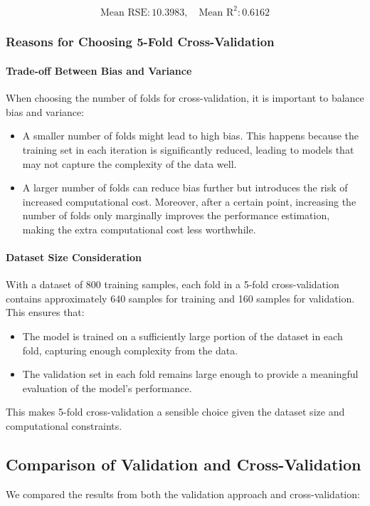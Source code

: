 \documentclass[a4paper,12pt]{article}
\begin{document}
\[
\text{Mean RSE}: 10.3983, \quad \text{Mean R}^2: 0.6162
\]

\subsubsection*{Reasons for Choosing 5-Fold Cross-Validation}

\paragraph{Trade-off Between Bias and Variance}
When choosing the number of folds for cross-validation, it is important to balance bias and variance:

\begin{itemize}
    \item A smaller number of folds  might lead to high bias. This happens because the training set in each iteration is significantly reduced, leading to models that may not capture the complexity of the data well.
    \item A larger number of folds  can reduce bias further but introduces the risk of increased computational cost. Moreover, after a certain point, increasing the number of folds only marginally improves the performance estimation, making the extra computational cost less worthwhile.
\end{itemize}

\paragraph{Dataset Size Consideration}
With a dataset of 800 training samples, each fold in a 5-fold cross-validation contains approximately 640 samples for training and 160 samples for validation. This ensures that:

\begin{itemize}
    \item The model is trained on a sufficiently large portion of the dataset in each fold, capturing enough complexity from the data.
    \item The validation set in each fold remains large enough to provide a meaningful evaluation of the model's performance.
\end{itemize}

This makes 5-fold cross-validation a sensible choice given the dataset size and computational constraints.

\subsection*{Comparison of Validation and Cross-Validation}
We compared the results from both the validation approach and cross-validation:
\end{document}
